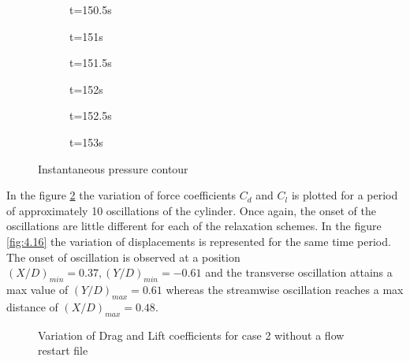 \begin{figure}[H]
\centering
	\begin{subfigure}[t]{7cm}
		\caption{t=150.5s}
	\end{subfigure}
	\begin{subfigure}[t]{7cm}
		\caption{t=151s}
	\end{subfigure}
	
	\begin{subfigure}[t]{7cm}
		\caption{t=151.5s}
	\end{subfigure}
	\begin{subfigure}[t]{7cm}
		\caption{t=152s}
	\end{subfigure}
	
	\begin{subfigure}[t]{7cm}
		\caption{t=152.5s}
	\end{subfigure}
	\begin{subfigure}[t]{7cm}
		\caption{t=153s}
	\end{subfigure}
\caption{Instantaneous pressure contour}
\label{fig:4.14}
\end{figure}

In the figure \ref{fig:4.15} the variation of force coefficients $C_d$ and $C_l$ is plotted for a period of approximately 10 oscillations of the cylinder. Once again, the onset of the oscillations are little different for each of the relaxation schemes. In the figure \ref{fig:4.16} the variation of displacements is represented for the same time period. The onset of oscillation is observed at a position $(X/D)_{min}=0.37, (Y/D)_{min}=-0.61$ and the transverse oscillation attains a max value of $(Y/D)_{max}=0.61$ whereas the streamwise oscillation reaches a max distance of $(X/D)_{max}=0.48$. 

\begin{figure}[H]
\centering
{}
\caption{Variation of Drag and Lift coefficients for case 2 without a flow restart file}
\label{fig:4.15}
\end{figure}

